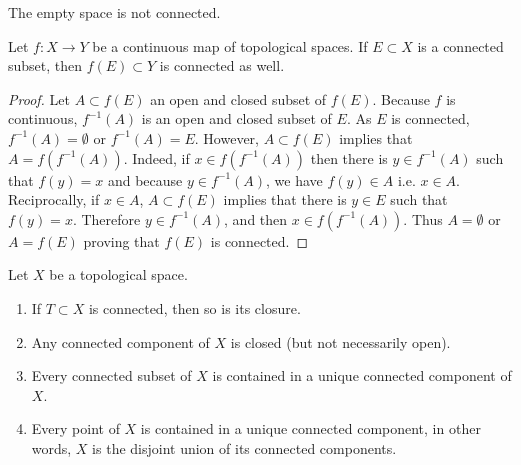 \noindent
The empty space is not connected.

\begin{lemma}
\label{lemma-image-connected-space}
Let $f : X \to Y$ be a continuous map of topological spaces.
If $E \subset X$ is a connected subset, then $f(E) \subset Y$
is connected as well.
\end{lemma}

\begin{proof}
Let $A \subset f(E)$ an open and closed subset of $f(E)$. Because $f$ is
continuous, $f^{-1}(A)$ is an open and closed subset of $E$. As $E$ is
connected, $f^{-1}(A) = \emptyset$ or $f^{-1}(A) = E$. However, $A\subset f(E)$
implies that $A = f(f^{-1}(A))$. Indeed, if $x\in f(f^{-1}(A))$ then there is
$y\in f^{-1}(A)$ such that $f(y) = x$ and because $y\in f^{-1}(A)$, we have
$f(y) \in A$ i.e. $x\in A$. Reciprocally, if $x\in A$, $A\subset f(E)$ implies
that there is $y\in E$ such that $f(y) = x$. Therefore $y\in f^{-1}(A)$, and
then $x\in f(f^{-1}(A))$. Thus $A = \emptyset$ or $A = f(E)$ proving that
$f(E)$ is connected.
\end{proof}

\begin{lemma}
\label{lemma-connected-components}
Let $X$ be a topological space.
\begin{enumerate}
\item If $T \subset X$ is connected, then so is its closure.
\item Any connected component of $X$ is closed (but not necessarily open).
\item Every connected subset of $X$ is contained in a unique connected
component of $X$.
\item Every point of $X$ is contained in a unique connected component, in other
words, $X$ is the disjoint union of its connected components.
\end{enumerate}
\end{lemma}

